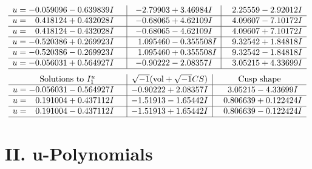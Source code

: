 \documentclass[1p]{elsarticle_modified}
\theoremstyle{definition}
\newcommand{\I}{\sqrt{-1}}
\begin{document}
$$\begin{array}{c|c|c}
\begin{aligned}
u &= -0.059096 - 0.639839 I\end{aligned}
 & -2.79903 + 3.46984 I & \phantom{-}2.25559 - 2.92012 I \\ \hline\begin{aligned}
u &= \phantom{-}0.418124 + 0.432028 I\end{aligned}
 & -0.68065 + 4.62109 I & \phantom{-}4.09607 - 7.10172 I \\ \hline\begin{aligned}
u &= \phantom{-}0.418124 - 0.432028 I\end{aligned}
 & -0.68065 - 4.62109 I & \phantom{-}4.09607 + 7.10172 I \\ \hline\begin{aligned}
u &= -0.520386 + 0.269923 I\end{aligned}
 & \phantom{-}1.095460 - 0.355508 I & \phantom{-}9.32542 + 1.84818 I \\ \hline\begin{aligned}
u &= -0.520386 - 0.269923 I\end{aligned}
 & \phantom{-}1.095460 + 0.355508 I & \phantom{-}9.32542 - 1.84818 I \\ \hline\begin{aligned}
u &= -0.056031 + 0.564927 I\end{aligned}
 & -0.90222 - 2.08357 I & \phantom{-}3.05215 + 4.33699 I\\
 \hline 
 \end{array}$$\newpage$$\begin{array}{c|c|c}  
\text{Solutions to }I^u_{1}& \I (\text{vol} + \sqrt{-1}CS) & \text{Cusp shape}\\
 \hline 
\begin{aligned}
u &= -0.056031 - 0.564927 I\end{aligned}
 & -0.90222 + 2.08357 I & \phantom{-}3.05215 - 4.33699 I \\ \hline\begin{aligned}
u &= \phantom{-}0.191004 + 0.437112 I\end{aligned}
 & -1.51913 - 1.65442 I & \phantom{-}0.806639 + 0.122424 I \\ \hline\begin{aligned}
u &= \phantom{-}0.191004 - 0.437112 I\end{aligned}
 & -1.51913 + 1.65442 I & \phantom{-}0.806639 - 0.122424 I\\
 \hline 
 \end{array}$$\newpage
\newpage\renewcommand{\arraystretch}{1}
\centering \section*{ II. u-Polynomials}
\end{document}
